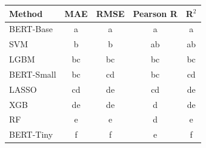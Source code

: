 \begin{tabular}{lcccc}
\toprule
Method & MAE & RMSE & Pearson R & R$^2$ \\
\midrule
BERT-Base & a & a & a & a \\
SVM & b & b & ab & ab \\
LGBM & bc & bc & bc & bc \\
BERT-Small & bc & cd & bc & cd \\
LASSO & cd & de & cd & de \\
XGB & de & de & d & de \\
RF & e & e & d & e \\
BERT-Tiny & f & f & e & f \\
\bottomrule
\end{tabular}
